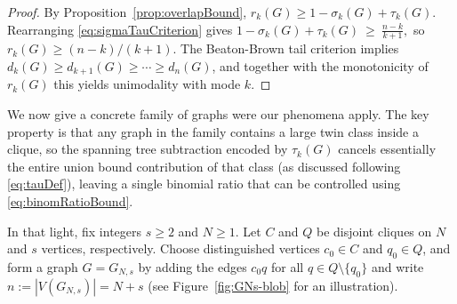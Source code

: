 \documentclass[11pt]{amsart}
\numberwithin{equation}{section}
\begin{document}
\begin{proof}
By Proposition~\ref{prop:overlapBound}, $r_k(G)\ge 1-\sigma_k(G)+\tau_k(G)$. Rearranging \eqref{eq:sigmaTauCriterion} gives $1-\sigma_k(G)+\tau_k(G)\ \ge\ \frac{n-k}{k+1},$ so $r_k(G)\ge (n-k)/(k+1)$. The Beaton-Brown tail criterion implies $d_k(G)\ge d_{k+1}(G)\ge\cdots\ge d_n(G)$, and together with the monotonicity of $r_k(G)$ this yields unimodality with mode $k$.
\end{proof}
We now give a concrete family of graphs were our phenomena apply. The key property is that any graph in the family contains a large twin class inside a clique, so the spanning tree subtraction encoded by $\tau_k(G)$ cancels essentially the entire union bound contribution of that class (as discussed following \eqref{eq:tauDef}), leaving a single binomial ratio that can be controlled using \eqref{eq:binomRatioBound}.

In that light, fix integers $s\ge 2$ and $N\ge 1$. Let $C$ and $Q$ be disjoint cliques on $N$ and $s$ vertices, respectively. Choose distinguished vertices $c_0\in C$ and $q_0\in Q$, and form a graph $G=G_{N,s}$ by adding the edges $c_0q$ for all $q\in Q\setminus\{q_0\}$ and write $n:=|V(G_{N,s})|=N+s$ (see Figure~\ref{fig:GNs-blob} for an illustration).

\end{document}
